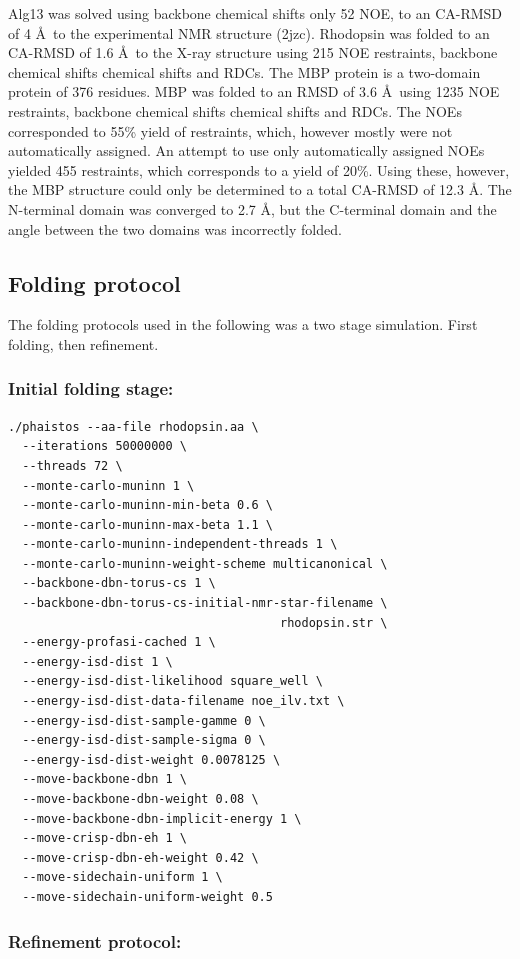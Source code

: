 Alg13 was solved using backbone chemical shifts only 52 NOE, to an CA-RMSD of 4 \AA~to the experimental NMR structure (2jzc).
Rhodopsin was folded to an CA-RMSD of 1.6 \AA~to the X-ray structure using 215 NOE restraints, backbone chemical shifts chemical shifts and RDCs.
The MBP protein is a two-domain protein of 376 residues.
MBP was folded to an RMSD of 3.6 \AA~using 1235 NOE restraints, backbone chemical shifts chemical shifts and RDCs.
The NOEs corresponded to 55\% yield of restraints, which, however mostly were not automatically assigned.
An attempt to use only automatically assigned NOEs yielded 455 restraints, which corresponds to a yield of 20\%. Using these, however, the MBP structure could only be determined to a total CA-RMSD of 12.3 \AA.
The N-terminal domain was converged to 2.7 \AA, but the C-terminal domain and the angle between the two domains was incorrectly folded.

\subsection{Folding protocol}
The folding protocols used in the following was a two stage simulation. First folding, then refinement.



\subsubsection{Initial folding stage:}
\begin{lstlisting}
./phaistos --aa-file rhodopsin.aa \
  --iterations 50000000 \
  --threads 72 \
  --monte-carlo-muninn 1 \
  --monte-carlo-muninn-min-beta 0.6 \
  --monte-carlo-muninn-max-beta 1.1 \
  --monte-carlo-muninn-independent-threads 1 \
  --monte-carlo-muninn-weight-scheme multicanonical \
  --backbone-dbn-torus-cs 1 \
  --backbone-dbn-torus-cs-initial-nmr-star-filename \
                                      rhodopsin.str \
  --energy-profasi-cached 1 \
  --energy-isd-dist 1 \
  --energy-isd-dist-likelihood square_well \
  --energy-isd-dist-data-filename noe_ilv.txt \
  --energy-isd-dist-sample-gamme 0 \
  --energy-isd-dist-sample-sigma 0 \
  --energy-isd-dist-weight 0.0078125 \
  --move-backbone-dbn 1 \
  --move-backbone-dbn-weight 0.08 \
  --move-backbone-dbn-implicit-energy 1 \
  --move-crisp-dbn-eh 1 \
  --move-crisp-dbn-eh-weight 0.42 \
  --move-sidechain-uniform 1 \
  --move-sidechain-uniform-weight 0.5
\end{lstlisting}

\subsubsection{Refinement protocol:}

